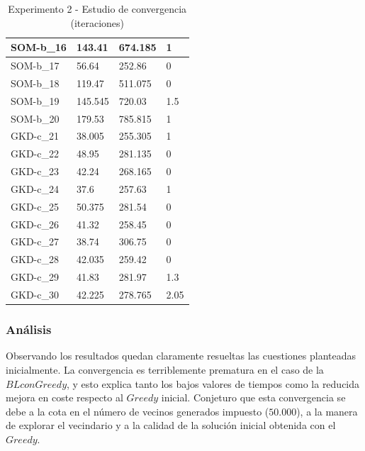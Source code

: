 \documentclass[11pt,a4paper]{article}
\begin{document}
\begin{center}
\begin{table}[H]
\begin{tabular}{l|l|l|l|}
				\multicolumn{1}{|l|}{SOM-b\_16} & 143.41         & 674.185         & 1             \\ \hline
				\multicolumn{1}{|l|}{SOM-b\_17} & 56.64          & 252.86          & 0             \\ \hline
				\multicolumn{1}{|l|}{SOM-b\_18} & 119.47         & 511.075         & 0             \\ \hline
				\multicolumn{1}{|l|}{SOM-b\_19} & 145.545        & 720.03          & 1.5           \\ \hline
				\multicolumn{1}{|l|}{SOM-b\_20} & 179.53         & 785.815         & 1             \\ \hline
				\multicolumn{1}{|l|}{GKD-c\_21} & 38.005         & 255.305         & 1             \\ \hline
				\multicolumn{1}{|l|}{GKD-c\_22} & 48.95          & 281.135         & 0             \\ \hline
				\multicolumn{1}{|l|}{GKD-c\_23} & 42.24          & 268.165         & 0             \\ \hline
				\multicolumn{1}{|l|}{GKD-c\_24} & 37.6           & 257.63          & 1             \\ \hline
				\multicolumn{1}{|l|}{GKD-c\_25} & 50.375         & 281.54          & 0             \\ \hline
				\multicolumn{1}{|l|}{GKD-c\_26} & 41.32          & 258.45          & 0             \\ \hline
				\multicolumn{1}{|l|}{GKD-c\_27} & 38.74          & 306.75          & 0             \\ \hline
				\multicolumn{1}{|l|}{GKD-c\_28} & 42.035         & 259.42          & 0             \\ \hline
				\multicolumn{1}{|l|}{GKD-c\_29} & 41.83          & 281.97          & 1.3           \\ \hline
				\multicolumn{1}{|l|}{GKD-c\_30} & 42.225         & 278.765         & 2.05          \\ \hline
			\end{tabular}
			\caption{ Experimento 2 - Estudio de convergencia (iteraciones) }
			\label{iteraciones}	
		\end{table}
	\end{center}

	\subsubsection{ Análisis }
	
	Observando los resultados quedan claramente resueltas las cuestiones planteadas inicialmente. La convergencia es terriblemente prematura en el caso de la $BL con Greedy$, y esto explica tanto los bajos valores de tiempos como la reducida mejora en coste respecto al $Greedy$ inicial. Conjeturo que esta convergencia se debe a la cota en el número de vecinos generados impuesto ($50.000$), a la manera de explorar el vecindario y a la calidad de la solución inicial obtenida con el $Greedy$. \\
	
\end{document}
